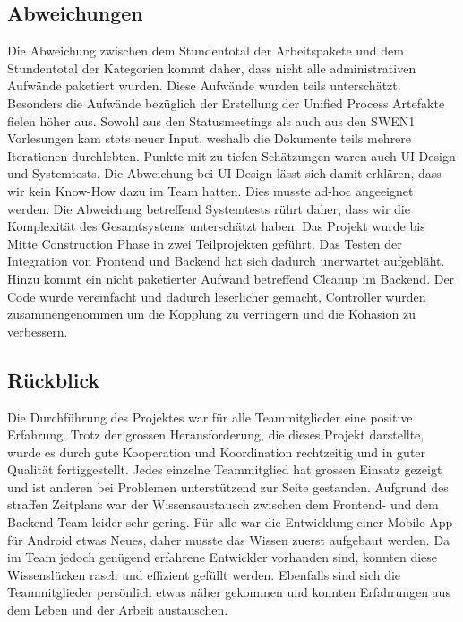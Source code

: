 \subsection{Abweichungen}\label{abweichungen}
Die Abweichung zwischen dem Stundentotal der Arbeitspakete und dem Stundentotal der Kategorien 
kommt daher, dass nicht alle administrativen Aufwände paketiert wurden. Diese Aufwände wurden
teils unterschätzt.
Besonders die Aufwände bezüglich der Erstellung der Unified Process Artefakte fielen höher aus. 
Sowohl aus den Statusmeetings als auch aus den SWEN1 Vorlesungen kam stets neuer Input, weshalb
die Dokumente teils mehrere Iterationen durchlebten.
Punkte mit zu tiefen Schätzungen waren auch UI-Design und Systemtests. Die Abweichung bei UI-Design
lässt sich damit erklären, dass wir kein Know-How dazu im Team hatten. Dies musste ad-hoc angeeignet 
werden. Die Abweichung betreffend Systemtests rührt daher, dass wir die Komplexität des Gesamtsystems
unterschätzt haben. Das Projekt wurde bis Mitte Construction Phase in zwei Teilprojekten geführt. Das
Testen der Integration von Frontend und Backend hat sich dadurch unerwartet aufgebläht.
Hinzu kommt ein nicht paketierter Aufwand betreffend Cleanup im Backend. Der Code wurde vereinfacht und
dadurch leserlicher gemacht, Controller wurden zusammengenommen um die Kopplung zu verringern und die
Kohäsion zu verbessern.

\subsection{Rückblick}\label{rueckblick}
Die Durchführung des Projektes war für alle Teammitglieder eine positive Erfahrung. Trotz der grossen
Herausforderung, die dieses Projekt darstellte, wurde es durch gute Kooperation und Koordination
rechtzeitig und in guter Qualität fertiggestellt.
Jedes einzelne Teammitglied hat grossen Einsatz gezeigt und ist anderen bei Problemen unterstützend
zur Seite gestanden. Aufgrund des straffen Zeitplans war der Wissensaustausch zwischen dem Frontend-
und dem Backend-Team leider sehr gering.
Für alle war die Entwicklung einer Mobile App für Android etwas Neues, daher musste das Wissen zuerst
aufgebaut werden. Da im Team jedoch genügend erfahrene Entwickler vorhanden sind, konnten diese
Wissenslücken rasch und effizient gefüllt werden. Ebenfalls sind sich die Teammitglieder persönlich
etwas näher gekommen und konnten Erfahrungen aus dem Leben und der Arbeit austauschen.

\newpage
